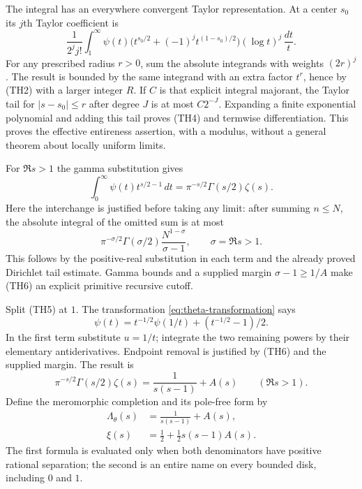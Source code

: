 The integral has an everywhere convergent Taylor representation.
At a center $s_0$ its $j$th Taylor coefficient is
\[
 \frac1{2^j j!}\int_1^\infty\psi(t)
 \bigl(t^{s_0/2}+(-1)^jt^{(1-s_0)/2}\bigr)
          (\log t)^j\,\frac{dt}{t}.                 \tag{TH4}
\]
For any prescribed radius $r>0$, sum the absolute integrands with
weights $(2r)^j$.  The result is bounded by the same integrand with
an extra factor $t^r$, hence by (TH2) with a larger integer $R$.
If $C$ is that explicit integral majorant, the Taylor tail for
$|s-s_0|\le r$ after degree $J$ is at most $C2^{-J}$.
Expanding a finite exponential polynomial and adding this tail proves
(TH4) and termwise differentiation.  This proves the effective
entireness assertion, with a modulus, without a general theorem about
locally uniform limits.

For $\Re s>1$ the gamma substitution gives
\[
 \int_0^\infty\psi(t)t^{s/2-1}\,dt
        =\pi^{-s/2}\Gamma(s/2)\zeta(s).             \tag{TH5}
\]
Here the interchange is justified before taking any limit: after
summing $n\le N$, the absolute integral of the omitted sum is at most
\[
 \pi^{-\sigma/2}\Gamma(\sigma/2)
                       \frac{N^{1-\sigma}}{\sigma-1},
 \qquad \sigma=\Re s>1.                            \tag{TH6}
\]
This follows by the positive-real substitution in each term and the
already proved Dirichlet tail estimate.  Gamma bounds and a supplied
margin $\sigma-1\ge1/A$ make (TH6) an explicit primitive recursive
cutoff.

Split (TH5) at $1$.  The transformation
\eqref{eq:theta-transformation} says
\[
 \psi(t)=t^{-1/2}\psi(1/t)+(t^{-1/2}-1)/2.
\]
In the first term substitute $u=1/t$; integrate the two remaining
powers by their elementary antiderivatives.  Endpoint removal is
justified by (TH6) and the supplied margin.  The result is
\begin{equation}
 \pi^{-s/2}\Gamma(s/2)\zeta(s)
       =\frac1{s(s-1)}+A(s)\qquad(\Re s>1).
 \label{eq:theta-completion-initial}
\end{equation}
Define the meromorphic completion and its pole-free form by
\begin{align}
 \Lambda_\theta(s)&=\frac1{s(s-1)}+A(s),\label{eq:theta-lambda}\\
 \xi(s)&=\frac12+\frac12s(s-1)A(s).\label{eq:theta-xi}
\end{align}
The first formula is evaluated only when both denominators have
positive rational separation; the second is an entire name on every
bounded disk, including $0$ and $1$.

